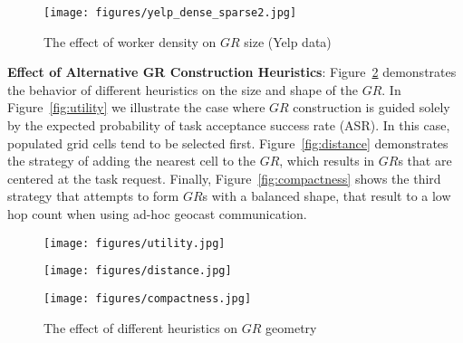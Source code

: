 \documentclass{USC-Thesis}
\newcommand{\PGC}{{PrivGeoCrowd}}
\numberwithin{equation}{chapter}
\begin{document}

\begin{figure}[!htb]
\centering
  \texttt{[image: figures/yelp\_dense\_sparse2.jpg]}
  \caption{The effect of worker density on $\mathit{GR}$ size (Yelp data)}
  \label{fig:dense_sparse}
\end{figure}

\textbf{Effect of Alternative GR Construction Heuristics}: Figure~\ref{fig:heuristics} demonstrates the behavior of different heuristics on the size and shape of the $\mathit{GR}$. In Figure~\ref{fig:utility} we illustrate the case where $GR$ construction is guided solely by the expected probability of task acceptance success rate (ASR). In this case, populated grid cells tend to be selected first. Figure~\ref{fig:distance} demonstrates the strategy of adding the nearest cell to the $GR$, which results in $\mathit{GR}$s that are centered at the task request. Finally, Figure~\ref{fig:compactness} shows the third strategy that attempts to form $GR$s with a balanced shape, that result to a low hop count when using ad-hoc geocast communication.

\begin{figure}[!ht]
	\centering
	\begin{minipage}[b]{0.25\linewidth}
		\texttt{[image: figures/utility.jpg]}
		\label{fig:utility}
	\end{minipage}
	\hspace{0.5cm}
	\centering
	\begin{minipage}[b]{0.25\linewidth}
		\texttt{[image: figures/distance.jpg]}
		\label{fig:distance}
	\end{minipage}
	\hspace{0.5cm}
	\centering
	\begin{minipage}[b]{0.26\linewidth}
		\texttt{[image: figures/compactness.jpg]}
		\label{fig:compactness}
	\end{minipage}
	\caption{The effect of different heuristics on $\mathit{GR}$ geometry}	
\label{fig:heuristics}
\end{figure}
\end{document}
